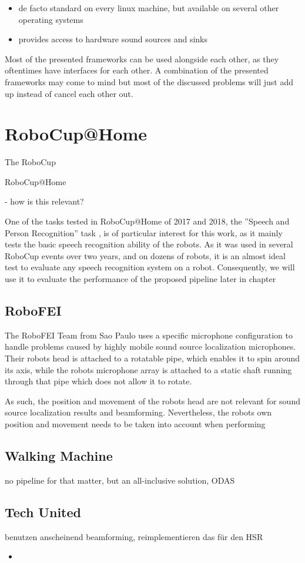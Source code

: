 \begin{itemize}
	\item de facto standard on every linux machine, but available on several other operating systems
	\item provides access to hardware sound sources and sinks
\end{itemize}

Most of the presented frameworks can be used alongside each other, as they oftentimes have interfaces for each other. 
A combination of the presented frameworks may come to mind but most of the discussed problems will just add up instead of cancel each other out.



\section{RoboCup@Home}
The RoboCup %

RoboCup@Home %

- how is this relevant?

One of the tasks tested in RoboCup@Home of 2017 and 2018, the ''Speech and Person Recognition'' task \cite{rulebook_2018}, is of particular interest for this work, as it mainly tests the basic speech recognition ability of the robots. 
As it was used in several RoboCup events over two years, and on dozens of robots, it is an almost ideal test to evaluate any speech recognition system on a robot.
Consequently, we will use it to evaluate the performance of the proposed pipeline later in chapter %

\subsection{RoboFEI}

The RoboFEI Team from Sao Paulo uses a specific microphone configuration to handle problems caused by highly mobile sound source localization microphones. %
Their robots head is attached to a rotatable pipe, which enables it to spin around its axis, while the robots microphone array is attached to a static shaft running through that pipe which does not allow it to rotate.

As such, the position and movement of the robots head are not relevant for sound source localization results and beamforming.
Nevertheless, the robots own position and movement needs to be taken into account when performing 


\subsection{Walking Machine}
no pipeline for that matter, but an all-inclusive solution, ODAS

\subsection{Tech United}
benutzen anscheinend beamforming, reimplementieren das für den HSR

\begin{itemize}
	\item 
\end{itemize}
